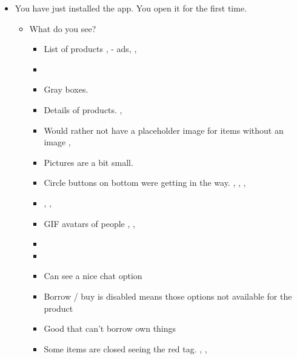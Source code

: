 \small
\begin{center}
	  
\end{center}
\begin{itemize}
	\item {You have just installed the app. You open it for the first time.
		\begin{itemize}
			\item What do you see?
					\begin{itemize}
						\item List of products ,  - ads, , 
						\item {} 
						\item Gray boxes. 
						\item Details of products. , 
						\item Would rather not have a placeholder image for items without an image ,  	
						\item Pictures are a bit small. 
						\item Circle buttons on bottom were getting in the way. , , , 
						\item {} , , 				
						\vspace{0.5cm}
						
						\item GIF avatars of people , , 
						\item {} 
						\item {} 
						\vspace{0.5cm}
						
						\item Can see a nice chat option  
						\item Borrow / buy is disabled means those options not available for the product  
						\item Good that can't borrow own things  
						\item Some items are closed seeing the red tag. , , 
						\vspace{0.5cm}
						

\end{itemize}
\end{itemize}}
\end{itemize}
